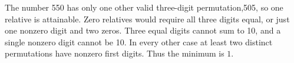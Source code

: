 The number 550 has only one other valid three-digit permutation,505, so one relative is attainable. Zero relatives would require all three digits equal, or just one nonzero digit and two zeros. Three equal digits cannot sum to 10, and a single nonzero digit cannot be 10. In every other case at least two distinct permutations have nonzero first digits. Thus the minimum is $\boxed1$.
